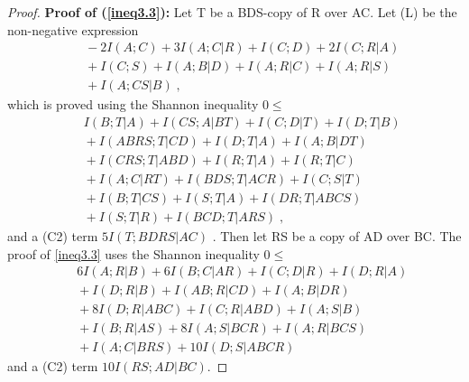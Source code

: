 \documentclass[10pt,journal]{IEEEtran}
\begin{document}
\begin{proof}
{\bf Proof of (\ref{ineq3.3}):}
Let T be a BDS-copy of R over AC.  Let (L) be the non-negative expression
\begin{align*}
&\ \  -2I(A;C)+3I(A;C|R)+I(C;D)+2I(C;R|A)\\
&\ \  +I(C;S)+I(A;B|D)+I(A;R|C)+I(A;R|S) \\
&\ \            +I(A;CS|B) \; ,
\end{align*}
which is proved using the Shannon inequality $0\leq $
\begin{align*}
&\ \  I(B;T|A)  + I(CS;A|BT) + I(C;D|T)+ I(D;T|B) \\
&\ \  + I(ABRS;T|CD) + I(D;T|A)+ I(A;B|DT)\\
&\ \  + I(CRS;T|ABD) + I(R;T|A) + I(R;T|C)\\
&\ \  + I(A;C|RT) + I(BDS;T|ACR) + I(C;S|T)\\
&\ \  + I(B;T|CS)+ I(S;T|A) + I(DR;T|ABCS)\\
&\ \  + I(S;T|R)  + I(BCD;T|ARS) \; ,
\end{align*}
and a (C2) term $5I(T;BDRS|AC)$ .  Then let RS be a copy of AD over BC.  The proof of \eqref{ineq3.3} uses the
Shannon inequality $0\leq $
\begin{align*}
&\ \  6I(A;R|B) + 6I(B;C|AR)+ I(C;D|R) + I(D;R|A)\\
&\ \    + I(D;R|B)+ I(AB;R|CD)+ I(A;B|DR)\\
&\ \    + 8I(D;R|ABC) + I(C;R|ABD) + I(A;S|B)\\
&\ \   + I(B;R|AS)+ 8I(A;S|BCR)  + I(A;R|BCS)\\
&\ \  + I(A;C|BRS)   + 10I(D;S|ABCR)
\end{align*}
and a (C2) term $10I(RS;AD|BC)$.


\end{proof}
\end{document}
